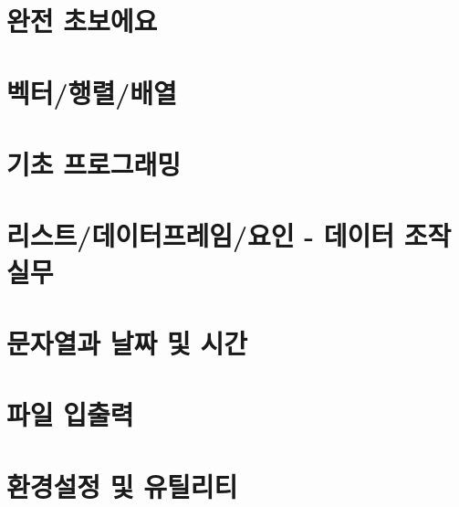 \documentclass[../tutorial.tex]{subfiles}
\begin{document}
% 


\chapter{완전 초보에요}
% 


\chapter{벡터/행렬/배열}
% 
% 

\chapter{기초 프로그래밍}
% 
% 

\chapter{리스트/데이터프레임/요인 - 데이터 조작실무}
% 
% 

\chapter{문자열과 날짜 및 시간}
% 
% 

\chapter{파일 입출력}
% 
% 

\chapter{환경설정 및 유틸리티}
% 
% 
\end{document}
